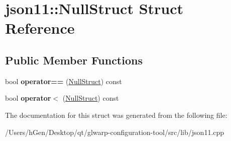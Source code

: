 \hypertarget{structjson11_1_1_null_struct}{}\section{json11\+:\+:Null\+Struct Struct Reference}
\label{structjson11_1_1_null_struct}
\subsection*{Public Member Functions}
\begin{DoxyCompactItemize}
\item 
\mbox{\label{structjson11_1_1_null_struct_a29752d42bbc3bdf8933ad57590a34a2d}} 
bool {\bfseries operator==} (\mbox{\hyperlink{structjson11_1_1_null_struct}{Null\+Struct}}) const
\item 
\mbox{\label{structjson11_1_1_null_struct_afe7c5e06a64fc0d83a6ff2393b71609d}} 
bool {\bfseries operator$<$} (\mbox{\hyperlink{structjson11_1_1_null_struct}{Null\+Struct}}) const
\end{DoxyCompactItemize}


The documentation for this struct was generated from the following file\+:\begin{DoxyCompactItemize}
\item 
/\+Users/h\+Gen/\+Desktop/qt/glwarp-\/configuration-\/tool/src/lib/json11.\+cpp\end{DoxyCompactItemize}
